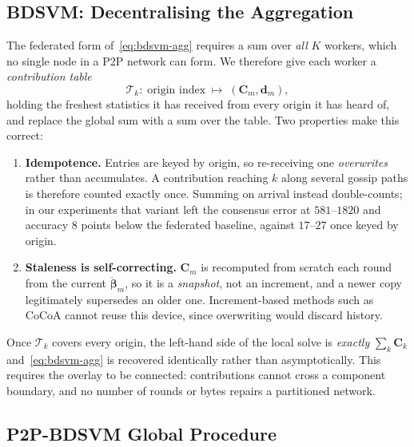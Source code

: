 \subsection{BDSVM: Decentralising the Aggregation}

The federated form of~\eqref{eq:bdsvm-agg} requires a sum over \emph{all} $K$
workers, which no single node in a P2P network can form. We therefore give each
worker a \emph{contribution table}
\begin{equation}
  \mathcal{T}_k : \; \text{origin index} \;\longmapsto\; (\mathbf{C}_m, \mathbf{d}_m),
\end{equation}
holding the freshest statistics it has received from every origin it has heard
of, and replace the global sum with a sum over the table. Two properties make
this correct:

\begin{enumerate}
  \item \textbf{Idempotence.} Entries are keyed by origin, so re-receiving one
        \emph{overwrites} rather than accumulates. A contribution reaching $k$
        along several gossip paths is therefore counted exactly once. Summing on
        arrival instead double-counts; in our experiments that variant left the
        consensus error at $581$--$1820$ and accuracy $8$ points below the
        federated baseline, against $17$--$27$ once keyed by origin.
  \item \textbf{Staleness is self-correcting.} $\mathbf{C}_m$ is recomputed from
        scratch each round from the current $\ddot{\boldsymbol{\beta}}_m$, so it
        is a \emph{snapshot}, not an increment, and a newer copy legitimately
        supersedes an older one. Increment-based methods such as CoCoA cannot
        reuse this device, since overwriting would discard history.
\end{enumerate}

Once $\mathcal{T}_k$ covers every origin, the left-hand side of the local solve
is \emph{exactly} $\sum_{k} \mathbf{C}_k$ and~\eqref{eq:bdsvm-agg} is recovered
identically rather than asymptotically. This requires the overlay to be
connected: contributions cannot cross a component boundary, and no number of
rounds or bytes repairs a partitioned network.

\subsection{P2P-BDSVM Global Procedure}

